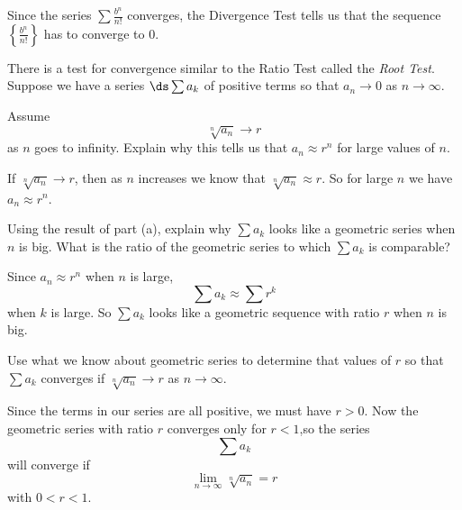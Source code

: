 \begin{exercises}
\begin{exerciseSolution}

\solution Since the series $\sum \frac{b^n}{n!}$ converges, the Divergence Test tells us that the sequence $\left\{\frac{b^n}{n!}\right\}$ has to converge to 0.

\end{exerciseSolution}

\ea

  \item \label{ex:8.3_Root_Test} There is a test for convergence similar to the Ratio Test called the \emph{Root Test}. Suppose we have a series $\ds \sum a_k$ of positive terms so that $a_n \to 0$ as $n \to \infty$.
  \ba
  \item Assume
  \[\sqrt[n]{a_n} \to r\]
as $n$ goes to infinity. Explain why this tells us that $a_n \approx r^n$ for large values of $n$.

\begin{exerciseSolution}

If $\sqrt[n]{a_n} \to r$, then as $n$ increases we know that $\sqrt[n]{a_n} \approx r$. So for large $n$ we have $a_n \approx r^n$.

\end{exerciseSolution}

\item Using the result of part (a), explain why $\sum a_k$ looks like a geometric series when $n$ is big. What is the ratio of the geometric series to which $\sum a_k$ is comparable?

\begin{exerciseSolution}

Since $a_n \approx r^n$ when $n$ is large,
\[\sum a_k \approx \sum r^k\]
when $k$ is large. So $\sum a_k$ looks like a geometric sequence with ratio $r$ when $n$ is big.

\end{exerciseSolution}

\item Use what we know about geometric series to determine that values of $r$ so that $\sum a_k$ converges if $\sqrt[n]{a_n} \to r$ as $n \to \infty$.

\begin{exerciseSolution}

Since the terms in our series are all positive, we must have $r > 0$.  Now the geometric series with ratio $r$ converges only for $r < 1$,so the series
\[\sum a_k\]
will converge if
\[\lim_{n \to \infty} \sqrt[n]{a_n} = r\]
with $0 < r < 1$.


\end{exerciseSolution}
\end{exercises}
